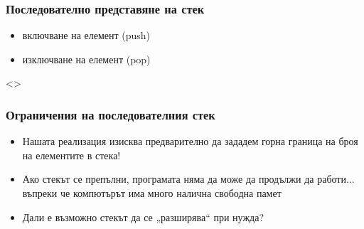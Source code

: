 \documentclass[alsotrans, beameroptions={aspectratio=169}]{beamerswitch}
\begin{document}
\begin{frame}
  \frametitle{Последователно представяне на стек}

  \begin{center}
  \end{center}

  \begin{itemize}
  \item<2-> включване на елемент (push)
  \item<3-> изключване на елемент (pop)
  \end{itemize}
\end{frame}

\begin{frame}<>
  \frametitle{Ограничения на последователния стек}

  \begin{itemize}[<+->]
  \item Нашата реализация изисква предварително да зададем горна граница на броя на елементите в стека!
  \item Ако стекът се препълни, програмата няма да може да продължи да работи... въпреки че компютърът има много налична свободна памет
  \item Дали е възможно стекът да се „разширява“ при нужда?
  \end{itemize}
\end{frame}

\end{document}
